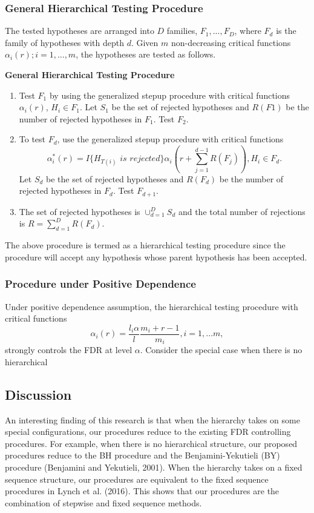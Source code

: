 \documentclass{article}
\begin{document}
\subsubsection{General Hierarchical Testing Procedure}
The tested hypotheses are arranged into $D$ families, $F_1,...,F_D$, where $F_d$ is the family of hypotheses with depth $d$. Given $m$ non-decreasing critical functions $\alpha_i(r); i = 1,...,m$, the hypotheses are tested as follows.
\vspace{3mm}

\textbf{General Hierarchical Testing Procedure}
\begin{enumerate}
	\item Test $F_1$ by using the generalized stepup procedure with critical functions $\alpha_i(r)$, $H_i \in F_1$. Let $S_1$ be the set of rejected hypotheses and $R(F1)$ be the number of rejected hypotheses in $F_1$. Test $F_2$.
	\item To test $F_d$, use the generalized stepup procedure with  critical functions
	$$ \alpha_i^*(r) = I\{H_{T(i)} \,\, is \, \, rejected\}\alpha_i\left(r+\sum_{j=1}^{d-1}R(F_j)\right), H_i \in F_d. $$
	Let $S_d$ be the set of rejected hypotheses and $R(F_d)$ be the number of rejected hypotheses in $F_d$. Test $F_{d+1}$.
	\item The set of rejected hypotheses is $\cup_{d=1}^D S_d$ and the total number of rejections is $R = \sum_{d=1}^{D}R(F_d)$. 
\end{enumerate}

The above procedure is termed as a hierarchical testing procedure since the procedure will accept any hypothesis whose parent hypothesis has been accepted.


\subsubsection{Procedure under Positive Dependence}
Under positive dependence assumption, the hierarchical testing procedure with critical functions
$$ \alpha_i(r) = \frac{l_i\alpha}{l}\frac{m_i+r-1}{m_i}, i=1,...m,$$ strongly controls the FDR at level $\alpha$.
Consider the special case when there is no hierarchical 
\subsection{Discussion}
An interesting finding of this research is that when the hierarchy takes on some special configurations, our procedures reduce to the existing FDR controlling procedures. For example,
when there is no hierarchical structure, our proposed procedures reduce to the BH procedure and the Benjamini-Yekutieli (BY) procedure (Benjamini and Yekutieli, 2001). When the hierarchy takes on a fixed sequence structure, our procedures are equivalent to the fixed sequence procedures in Lynch et al. (2016). This shows that our procedures are the combination
of stepwise and fixed sequence methods.
\end{document}
